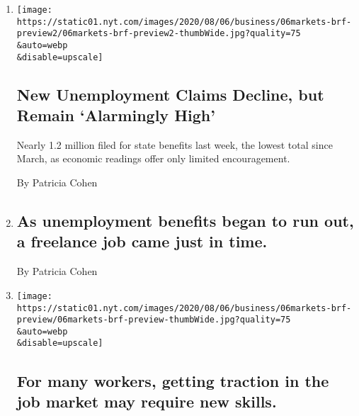 \begin{enumerate}
\def\labelenumi{\arabic{enumi}.}
\item
  \href{/2020/08/06/business/economy/unemployment-claims.html}{}

  \texttt{[image: https://static01.nyt.com/images/2020/08/06/business/06markets-brf-preview2/06markets-brf-preview2-thumbWide.jpg?quality=75\\\&auto=webp\\\&disable=upscale]}

  \hypertarget{new-unemployment-claims-decline-but-remain-alarmingly-high}{%
  \subsection{New Unemployment Claims Decline, but Remain `Alarmingly
  High'}\label{new-unemployment-claims-decline-but-remain-alarmingly-high}}

  Nearly 1.2 million filed for state benefits last week, the lowest
  total since March, as economic readings offer only limited
  encouragement.

  By Patricia Cohen
\item
  \href{/2020/08/06/business/as-unemployment-benefits-began-to-run-out-a-freelance-job-came-just-in-time.html}{}

  \hypertarget{as-unemployment-benefits-began-to-run-out-a-freelance-job-came-just-in-time}{%
  \subsection{As unemployment benefits began to run out, a freelance job
  came just in
  time.}\label{as-unemployment-benefits-began-to-run-out-a-freelance-job-came-just-in-time}}

  By Patricia Cohen
\item
  \href{/2020/08/06/business/for-many-workers-getting-traction-in-the-job-market-may-require-new-skills.html}{}

  \texttt{[image: https://static01.nyt.com/images/2020/08/06/business/06markets-brf-preview/06markets-brf-preview-thumbWide.jpg?quality=75\\\&auto=webp\\\&disable=upscale]}

  \hypertarget{for-many-workers-getting-traction-in-the-job-market-may-require-new-skills}{%
  \subsection{For many workers, getting traction in the job market may
  require new
  skills.}\label{for-many-workers-getting-traction-in-the-job-market-may-require-new-skills}}


\end{enumerate}
